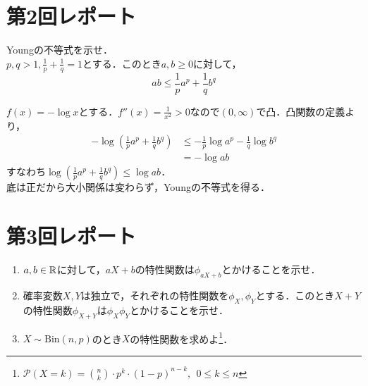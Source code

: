 \documentclass[dvipdfmx, leqno]{jsbook}
\begin{document}
\section{第2回レポート}
\begin{tcolorbox}
	Youngの不等式を示せ．\\
	$p, q> 1, \frac{1}{p}+ \frac{1}{q}= 1$とする．このとき$a, b\ge 0$に対して，
\begin{equation*}
	ab\le \frac{1}{p}a^p+ \frac{1}{q}b^q
\end{equation*}
\end{tcolorbox}

\begin{souanswer}
	$f(x)= -\log{x}$とする．$f''(x)= \frac{1}{x^2}> 0$なので$(0, \infty)$で凸．凸関数の定義より，
\begin{align*}
	-\log{\left(\frac{1}{p}a^p+ \frac{1}{q}b^q\right)}
	&\le -\frac{1}{p}\log{a^p}- \frac{1}{q}\log{b^q}\\
	&= -\log{ab}
\end{align*}
	すなわち$\log{\left(\frac{1}{p}a^p+ \frac{1}{q}b^q\right)}\le \log{ab}$．\\
	底は正だから大小関係は変わらず，Youngの不等式を得る．
\end{souanswer}

\section{第3回レポート}
\begin{tcolorbox}
\begin{enumerate}
    \item $a, b\in \mathbb{R}$に対して，$aX+ b$の特性関数は$\phi_{aX+ b}$とかけることを示せ．
    \item 確率変数$X, Y$は独立で，それぞれの特性関数を$\phi_X, \phi_Y$とする．このとき$X+ Y$の特性関数$\phi_{X+ Y}$は$\phi_X\phi_Y$とかけることを示せ．
    \item $X\sim \mathrm{Bin}(n, p)$のとき$X$の特性関数を求めよ\footnote{$\mathcal{P}(X= k)= \binom{n}{k}\cdot p^k\cdot (1- p)^{n- k},\ \ 0\le k\le n$}．
\end{enumerate}
\end{tcolorbox}
    
\end{document}
